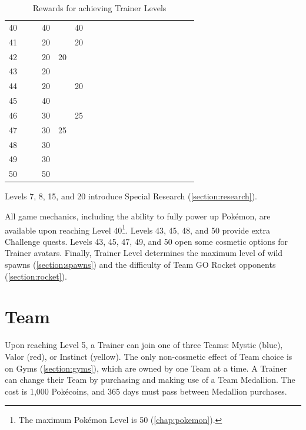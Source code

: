 \begin{table}[t]
\begin{center}
\begin{tabular}{r g c g c g c g c g c g c g c g c g c}
   40 &    &    & 40 &    & 40 & & & &   &    &    &    &    &    &   &   &   & \\
   41 &    &    & 20 &    & 20 & & & &   &    &    &    &    &    &   &   &   & \\
   42 &    &    & 20 & 20 &    & & & &   &    &    &    &    &    &   &   &   & \\
   43 &    &    & 20 &    &    & & & &   &    &    &    &    &    &   &   &   & \\
   44 &    &    & 20 &    & 20 & & & &   &    &    &    &    &    &   &   &   & \\
   45 &    &    & 40 &    &    & & & &   &    &    &    &    &    &   &   &   & \\
   46 &    &    & 30 &    & 25 & & & &   &    &    &    &    &    &   &   &   & \\
   47 &    &    & 30 & 25 &    & & & &   &    &    &    &    &    &   &   &   & \\
   48 &    &    & 30 &    &    & & & &   &    &    &    &    &    &   &   &   & \\
   49 &    &    & 30 &    &    & & & &   &    &    &    &    &    &   &   &   & \\
   50 &    &    & 50 &    &    & & & &   &    &    &    &    &    &   &   &   & \\
\end{tabular}
\caption{Rewards for achieving Trainer Levels}
\label{table:levelitems}
\end{center}
\end{table}
Levels 7, 8, 15, and 20 introduce Special Research (\autoref{section:research}).

All game mechanics, including the ability to fully power up Pokémon,
 are available upon reaching Level 40\footnote{The maximum Pokémon Level is 50 (\autoref{chap:pokemon}).}.
Levels 43, 45, 48, and 50 provide extra Challenge quests.
Levels 43, 45, 47, 49, and 50 open some cosmetic options for Trainer avatars.
Finally, Trainer Level determines the maximum level of wild spawns
  (\autoref{section:spawns}) and the difficulty of Team GO Rocket
  opponents (\autoref{section:rocket}).

\section{Team}
Upon reaching Level 5, a Trainer can join one of three Teams: Mystic (blue),
  Valor (red), or Instinct (yellow).
The only non-cosmetic effect of Team choice is on Gyms (\autoref{section:gyms}), which
  are owned by one Team at a time.
A Trainer can change their Team by purchasing and making use of a Team Medallion.
The cost is 1,000 Pokécoins, and 365 days must pass between Medallion purchases.

